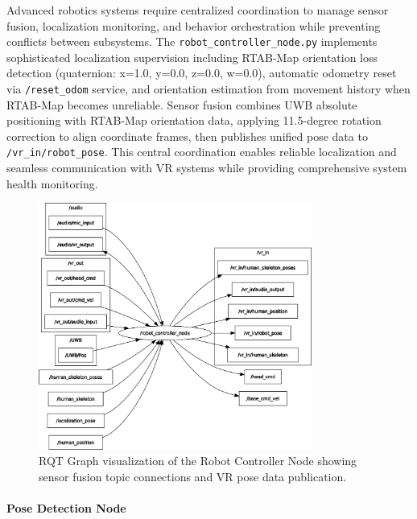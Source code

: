 Advanced robotics systems require centralized coordination to manage sensor fusion, localization monitoring, and behavior orchestration while preventing conflicts between subsystems. The \texttt{robot\_controller\_node.py} implements sophisticated localization supervision including RTAB-Map orientation loss detection (quaternion: x=1.0, y=0.0, z=0.0, w=0.0), automatic odometry reset via \texttt{/reset\_odom} service, and orientation estimation from movement history when RTAB-Map becomes unreliable. Sensor fusion combines UWB absolute positioning with RTAB-Map orientation data, applying 11.5-degree rotation correction to align coordinate frames, then publishes unified pose data to \texttt{/vr\_in/robot\_pose}. This central coordination enables reliable localization and seamless communication with VR systems while providing comprehensive system health monitoring.

\begin{figure}[H]
    \centering
    \includegraphics[width=0.8\textwidth]{Images/robotcontrollernode.png}
    \caption{RQT Graph visualization of the Robot Controller Node showing sensor fusion topic connections and VR pose data publication.}
    \label{fig:rqt_robot_controller_node}
\end{figure}

\paragraph{Pose Detection Node}

